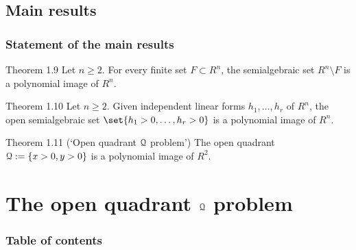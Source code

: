 \documentclass{beamer}
\begin{document}
\subsection{Main results}
\begin{frame}
\frametitle{Statement of the main results}

\begin{block}{Theorem 1.9}
Let $n\ge2$. For every finite set $F\subset R^n$, the semialgebraic set $R^n\setminus F$ is a polynomial image of $R^n$.
\end{block} 
\vspace{0.4cm}

\begin{block}{Theorem 1.10}
Let $n\ge 2$. Given independent linear forms $h_1,\dots,h_r$ of $R^n$, the open semialgebraic set $\set{h_1>0,\dots,h_r>0}$ is a polynomial image of $R^n$.
\end{block} 
\vspace{0.4cm}

\begin{block}{Theorem 1.11 (`Open quadrant $\mathcal{Q}$ problem')}
The open quadrant $\mathcal{Q}:=\{x>0,y>0\}$ is a polynomial image of $R^2$.
\end{block}
\end{frame}

\section{The open quadrant $\mathcal{Q}$ problem}
\begin{frame}
\frametitle{Table of contents}
\tableofcontents[currentsection]
\end{frame} 
\end{document}
